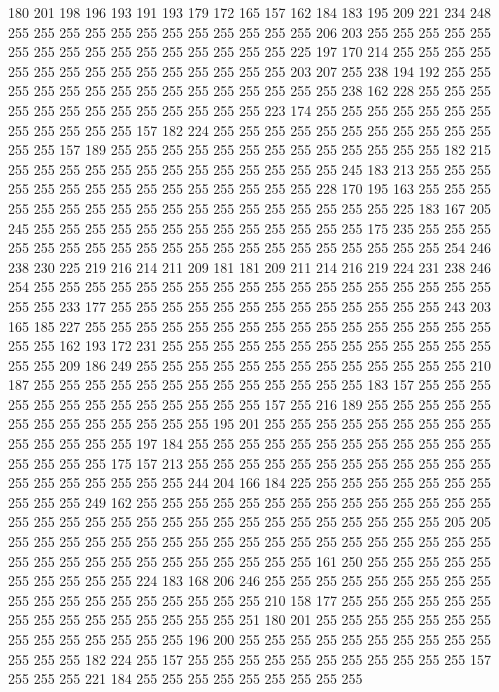 180 201 198 196 193 191 193 179 172 165 157 162 184 183 195 209 221 234 248 255
255 255 255 255 255 255 255 255 255 255 255 206 203 255 255 255 255 255 255 255
255 255 255 255 255 255 255 255 255 225 197 170 214 255 255 255 255 255 255 255
255 255 255 255 255 255 255 255 203 207 255 238 194 192 255 255 255 255 255 255
255 255 255 255 255 255 255 255 255 238 162 228 255 255 255 255 255 255 255 255
255 255 255 255 255 223 174 255 255 255 255 255 255 255 255 255 255 255 255 157
182 224 255 255 255 255 255 255 255 255 255 255 255 255 255 157 189 255 255 255
255 255 255 255 255 255 255 255 255 255 182 215 255 255 255 255 255 255 255 255
255 255 255 255 255 245 183 213 255 255 255 255 255 255 255 255 255 255 255 255
255 255 255 228 170 195 163 255 255 255 255 255 255 255 255 255 255 255 255 255
255 255 255 255 255 225 183 167 205 245 255 255 255 255 255 255 255 255 255 255
255 255 255 175 235 255 255 255 255 255 255 255 255 255 255 255 255 255 255 255
255 255 255 255 255 254 246 238 230 225 219 216 214 211 209 181 181 209 211 214
216 219 224 231 238 246 254 255 255 255 255 255 255 255 255 255 255 255 255 255
255 255 255 255 255 255 255 233 177 255 255 255 255 255 255 255 255 255 255 255
255 255 243 203 165 185 227 255 255 255 255 255 255 255 255 255 255 255 255 255
255 255 255 255 255 162 193 172 231 255 255 255 255 255 255 255 255 255 255 255
255 255 255 255 209 186 249 255 255 255 255 255 255 255 255 255 255 255 255 255
210 187 255 255 255 255 255 255 255 255 255 255 255 255 255 183 157 255 255 255
255 255 255 255 255 255 255 255 255 255 157 255 216 189 255 255 255 255 255 255
255 255 255 255 255 255 255 195 201 255 255 255 255 255 255 255 255 255 255 255
255 255 255 197 184 255 255 255 255 255 255 255 255 255 255 255 255 255 255 255
255 175 157 213 255 255 255 255 255 255 255 255 255 255 255 255 255 255 255 255
255 255 255 244 204 166 184 225 255 255 255 255 255 255 255 255 255 255 249 162
255 255 255 255 255 255 255 255 255 255 255 255 255 255 255 255 255 255 255 255
255 255 255 255 255 255 255 255 255 255 255 205 205 255 255 255 255 255 255 255
255 255 255 255 255 255 255 255 255 255 255 255 255 255 255 255 255 255 255 255
255 255 255 255 161 250 255 255 255 255 255 255 255 255 255 255 224 183 168 206
246 255 255 255 255 255 255 255 255 255 255 255 255 255 255 255 255 255 255 255
210 158 177 255 255 255 255 255 255 255 255 255 255 255 255 255 255 255 251 180
201 255 255 255 255 255 255 255 255 255 255 255 255 255 255 196 200 255 255 255
255 255 255 255 255 255 255 255 255 255 182 224 255 157 255 255 255 255 255 255
255 255 255 255 255 157 255 255 255 221 184 255 255 255 255 255 255 255 255 255
